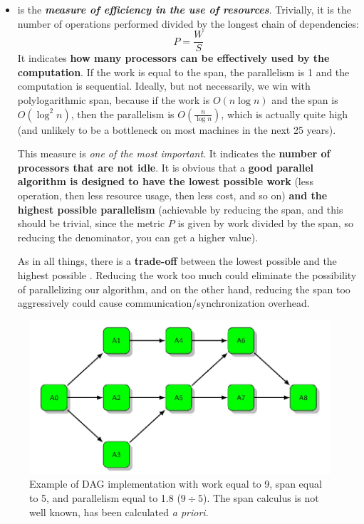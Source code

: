 \begin{itemize}
    \newpage
    \item {} is the \emph{\textbf{measure of efficiency in the use of resources}}. Trivially, it is the number of operations performed divided by the longest chain of dependencies:
    \begin{equation}
        P = \dfrac{W}{S}
    \end{equation}
    It indicates \textbf{how many processors can be effectively used by the computation}. If the work is equal to the span, the parallelism is 1 and the computation is sequential. Ideally, but not necessarily, we win with polylogarithmic span, because if the work is $O(n \log n)$ and the span is $O(\log^{2} n)$, then the parallelism is $O\left(\frac{n}{\log n}\right)$, which is actually quite high (and unlikely to be a bottleneck on most machines in the next 25 years).\cite{introductionToParallelAlgorithmsUMD}

    This measure is \emph{one of the most important}. It indicates the \textbf{number of processors that are not idle}. It is obvious that a \textbf{good parallel algorithm is designed to have the lowest possible work} (less operation, then less resource usage, then less cost, and so on) \textbf{and the highest possible parallelism} (achievable by reducing the span, and this should be trivial, since the metric $P$ is given by work divided by the span, so reducing the denominator, you can get a higher value).

    As in all things, there is a \textbf{trade-off} between the lowest possible  and the highest possible . Reducing the work too much could eliminate the possibility of parallelizing our algorithm, and on the other hand, reducing the span too aggressively could cause communication/synchronization overhead.
\end{itemize}

\begin{figure}[!htp]
    \centering
    \includegraphics[width=.7\textwidth]{img/dag-1.pdf}
    \caption{Example of DAG implementation with work equal to 9, span equal to 5, and parallelism equal to 1.8 ($9 \div 5$). The span calculus is not well known, has been calculated \emph{a priori}.}
\end{figure}

